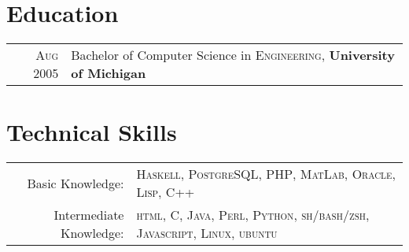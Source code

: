 \documentclass[a4paper,10pt]{article}
\begin{document}
\section{Education}
\begin{tabular}{rl}
\textsc{Aug} 2005 & Bachelor of Computer Science in \textsc{Engineering}, \textbf{University of Michigan}\\
\end{tabular}

\section{Technical Skills}
\begin{tabular}{rl}
Basic Knowledge:        & \textsc{Haskell},
                            \textsc{PostgreSQL},
                            \textsc{PHP},
                            \textsc{MatLab},
                            \textsc{Oracle},
                            \textsc{Lisp},
                            \textsc{C++} \\
Intermediate Knowledge: & \textsc{html},
                            \textsc{C},
                            \textsc{Java},
                            \textsc{Perl},
                            \textsc{Python},
                            \textsc{sh/bash/zsh},
                            \textsc{Javascript},
                            \textsc{Linux}, \textsc{ubuntu} \\


\end{tabular}

\end{document}
